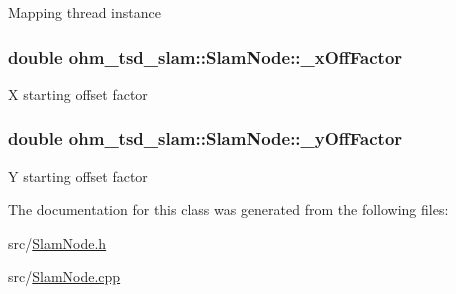 Mapping thread instance \hypertarget{classohm__tsd__slam_1_1SlamNode_a794eb5cfc1ba5f68d10e034061c3aed0}{
\subsubsection[{\-\_\-x\-Off\-Factor}]{\setlength{\rightskip}{0pt plus 5cm}double ohm\-\_\-tsd\-\_\-slam\-::\-Slam\-Node\-::\-\_\-x\-Off\-Factor\hspace{0.3cm}{\ttfamily [private]}}}\label{classohm__tsd__slam_1_1SlamNode_a794eb5cfc1ba5f68d10e034061c3aed0}
X starting offset factor \hypertarget{classohm__tsd__slam_1_1SlamNode_a275194525a13fc4400406d172a9742d4}{
\subsubsection[{\-\_\-y\-Off\-Factor}]{\setlength{\rightskip}{0pt plus 5cm}double ohm\-\_\-tsd\-\_\-slam\-::\-Slam\-Node\-::\-\_\-y\-Off\-Factor\hspace{0.3cm}{\ttfamily [private]}}}\label{classohm__tsd__slam_1_1SlamNode_a275194525a13fc4400406d172a9742d4}
Y starting offset factor 

The documentation for this class was generated from the following files\-:\begin{DoxyCompactItemize}
\item 
src/\hyperlink{SlamNode_8h}{Slam\-Node.\-h}\item 
src/\hyperlink{SlamNode_8cpp}{Slam\-Node.\-cpp}\end{DoxyCompactItemize}
